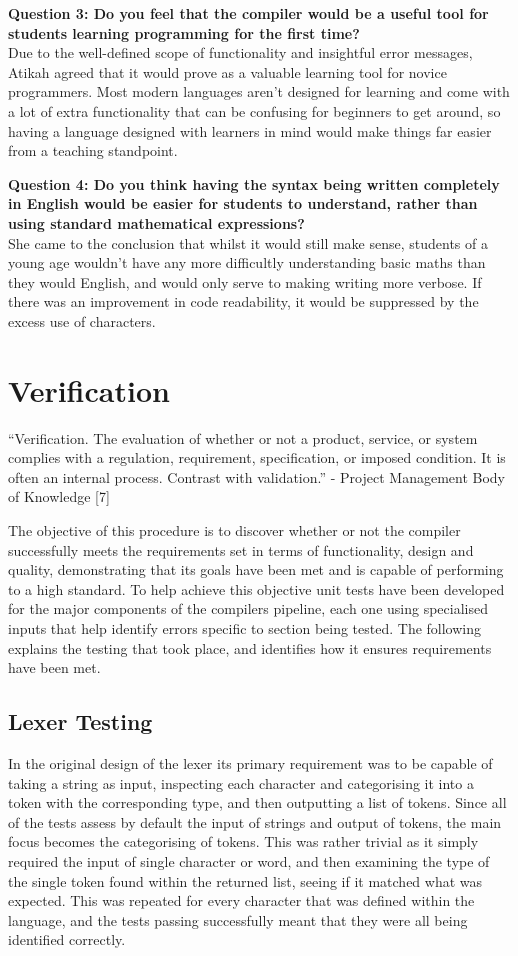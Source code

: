 \documentclass[
]{report}
\begin{document}
\textbf{Question 3: Do you feel that the compiler would be a useful tool
for students learning programming for the first time?}\\
Due to the well-defined scope of functionality and insightful error
messages, Atikah agreed that it would prove as a valuable learning tool
for novice programmers. Most modern languages aren't designed for
learning and come with a lot of extra functionality that can be
confusing for beginners to get around, so having a language designed
with learners in mind would make things far easier from a teaching
standpoint.

\textbf{Question 4: Do you think having the syntax being written
completely in English would be easier for students to understand, rather
than using standard mathematical expressions?}\\
She came to the conclusion that whilst it would still make sense,
students of a young age wouldn't have any more difficultly understanding
basic maths than they would English, and would only serve to making
writing more verbose. If there was an improvement in code readability,
it would be suppressed by the excess use of characters.

\section{Verification}
``Verification. The evaluation of whether or not a product, service, or
system complies with a regulation, requirement, specification, or
imposed condition. It is often an internal process. Contrast with
validation.'' - Project Management Body of Knowledge {[}7{]}

The objective of this procedure is to discover whether or not the
compiler successfully meets the requirements set in terms of
functionality, design and quality, demonstrating that its goals have
been met and is capable of performing to a high standard. To help
achieve this objective unit tests have been developed for the major
components of the compilers pipeline, each one using specialised inputs
that help identify errors specific to section being tested. The
following explains the testing that took place, and identifies how it
ensures requirements have been met.

\subsection{Lexer Testing}
In the original design of the lexer its primary requirement was to be
capable of taking a string as input, inspecting each character and
categorising it into a token with the corresponding type, and then
outputting a list of tokens. Since all of the tests assess by default
the input of strings and output of tokens, the main focus becomes the
categorising of tokens. This was rather trivial as it simply required
the input of single character or word, and then examining the type of
the single token found within the returned list, seeing if it matched
what was expected. This was repeated for every character that was
defined within the language, and the tests passing successfully meant
that they were all being identified correctly.
\end{document}
